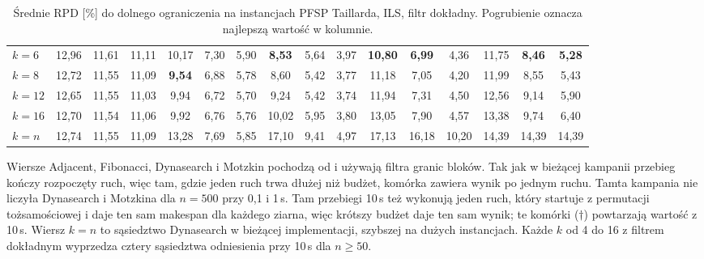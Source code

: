 \documentclass[letterpaper]{article} %
\theoremstyle{definition}
\begin{document}
\begin{table}[t]
\begin{tabular}{@{}l*{15}{c}@{}}
$k=6$ & 12{,}96 & 11{,}61 & 11{,}11 & 10{,}17 & 7{,}30 & 5{,}90 & \textbf{8{,}53} & 5{,}64 & 3{,}97 & \textbf{10{,}80} & \textbf{6{,}99} & 4{,}36 & 11{,}75 & \textbf{8{,}46} & \textbf{5{,}28} \\
$k=8$ & 12{,}72 & 11{,}55 & 11{,}09 & \textbf{9{,}54} & 6{,}88 & 5{,}78 & 8{,}60 & 5{,}42 & 3{,}77 & 11{,}18 & 7{,}05 & 4{,}20 & 11{,}99 & 8{,}55 & 5{,}43 \\
$k=12$ & 12{,}65 & 11{,}55 & 11{,}03 & 9{,}94 & 6{,}72 & 5{,}70 & 9{,}24 & 5{,}42 & 3{,}74 & 11{,}94 & 7{,}31 & 4{,}50 & 12{,}56 & 9{,}14 & 5{,}90 \\
$k=16$ & 12{,}70 & 11{,}54 & 11{,}06 & 9{,}92 & 6{,}76 & 5{,}76 & 10{,}02 & 5{,}95 & 3{,}80 & 13{,}05 & 7{,}90 & 4{,}57 & 13{,}38 & 9{,}74 & 6{,}40 \\
$k=n$ & 12{,}74 & 11{,}55 & 11{,}09 & 13{,}28 & 7{,}69 & 5{,}85 & 17{,}10 & 9{,}41 & 4{,}97 & 17{,}13 & 16{,}18 & 10{,}20 & 14{,}39 & 14{,}39 & 14{,}39 \\
\bottomrule
\end{tabular}
\caption{Średnie RPD [\%] do dolnego ograniczenia na instancjach PFSP Taillarda, ILS, filtr dokładny.
Pogrubienie oznacza najlepszą wartość w kolumnie.}
\label{tab:main}
\end{table}
Wiersze Adjacent, Fibonacci, Dynasearch i Motzkin pochodzą
od \citet{wojewodzki2026windowed} i używają filtra granic bloków. Tak jak
w bieżącej kampanii przebieg kończy rozpoczęty ruch, więc tam, gdzie
jeden ruch trwa dłużej niż budżet, komórka zawiera wynik po jednym
ruchu. Tamta kampania nie liczyła Dynasearch i Motzkina dla $n=500$
przy 0,1 i 1\,s. Tam przebiegi 10\,s też wykonują jeden ruch, który
startuje z permutacji tożsamościowej i daje ten sam makespan dla każdego
ziarna, więc krótszy budżet daje ten sam wynik; te komórki ($\dagger$)
powtarzają wartość z 10\,s. Wiersz
$k=n$ to sąsiedztwo Dynasearch w bieżącej implementacji, szybszej na
dużych instancjach. Każde $k$ od 4 do 16 z filtrem dokładnym wyprzedza
cztery sąsiedztwa odniesienia przy 10\,s dla $n\geq 50$.
\end{document}
